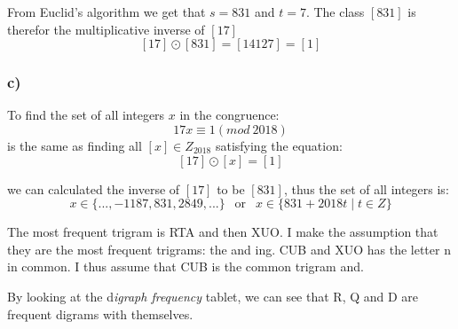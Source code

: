 \documentclass{article}
\begin{document}
	From Euclid's algorithm we get that $s = 831$ and $t=7$. The class $[831]$ is therefor the multiplicative inverse of $[17]$ 
	$$
	[17] \odot [831] = [14127] = [1]
	$$
	
	\subsubsection*{c)}
	To find the set of all integers $x$ in the congruence:
	$$
	17x \equiv 1 (mod \ 2018)
	$$
	is the same as finding all $[x] \in Z_{2018}$ satisfying the equation:
	$$
	[17] \odot [x] = [1]
	$$
	
	we can calculated the inverse of $[17]$ to be $[831]$, thus the set of all integers is:
	$$
	x \in \{...,-1187,831,2849,...\} \ \ \text{ or } \ \ x \in \{831+2018t \mid t \in Z\}
	$$
	
	The most frequent trigram is RTA and then XUO. I make the assumption that they are the most frequent trigrams: the and ing. CUB and XUO has the letter n in common. I thus assume that CUB is the common trigram and.
	
	By looking at the d\textit{igraph frequency} tablet, we can see that R, Q and D are frequent digrams with themselves. 
	
\end{document}
